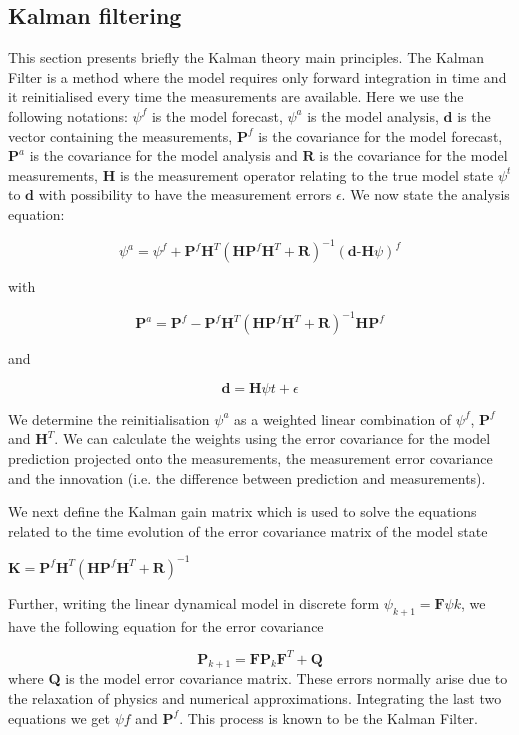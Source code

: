 \documentclass[a4,12pt]{article}
\begin{document}
\subsection{Kalman filtering}
This section presents briefly the Kalman theory main principles.
The Kalman Filter is a method where the model requires only forward integration in time and it reinitialised every time the measurements are available. Here we use the following notations: $\psi^{f}$ is the model forecast, $\psi^{a}$ is the model analysis, $\textbf{d}$ is the vector containing the measurements, $\textbf{P}^{f}$ is the covariance for the model forecast, $\textbf{P}^{a}$ is the covariance for the model analysis and $\textbf{R}$ is the covariance for the model measurements, $\textbf{H}$ is the measurement operator relating to the true model state $\psi ^{t}$ to $\textbf{d}$ with possibility to have the measurement errors $\epsilon$. We now state the analysis equation:

$$\psi ^{a} = \psi ^{f} + \textbf{P} ^{f}\textbf{H} ^{T}(\textbf{HP} ^{f}\textbf{H} ^{T}+\textbf{R}) ^{-1}(\textbf{d-H}\psi) ^{f}$$

with

$$\textbf{P}^{a} = \textbf{P}^{f} - \textbf{P}^{f}\textbf{H}^{T}(\textbf{HP}^{f}\textbf{H}^{T}+\textbf{R})^{-1}\textbf{HP}^{f} $$

and 

$$\textbf{d} = \textbf{H}\psi{t} + \epsilon$$

We determine the reinitialisation $\psi^{a}$ as a weighted linear combination of $\psi^{f}$, $\textbf{P}^{f}$ and $\textbf{H}^{T}$. We can calculate the weights using the error covariance for the model prediction projected onto the measurements, the measurement error covariance and the innovation (i.e. the difference between prediction and measurements).     

We next define the Kalman gain matrix which is used to solve the equations related to the time evolution of the error covariance matrix of the model state

$\textbf{K} = \textbf{P}^{f}\textbf{H}^{T}(\textbf{H}\textbf{P}^{f}\textbf{H}^{T}+\textbf{R})^{-1}$

Further, writing the linear dynamical model in discrete form $\psi_{k+1}=\textbf{F}\psi{k}$, we have the following equation for the error covariance

$$\textbf{P}_{k+1}=\textbf{F}\textbf{P}_{k}\textbf{F}^{T}+\textbf{Q}$$
where \textbf{Q} is the model error covariance matrix. These errors normally arise due to the relaxation of physics and numerical approximations. Integrating the last two equations we get $\psi{f}$ and $\textbf{P}^{f}$. This process is known to be the Kalman Filter.
\end{document}

